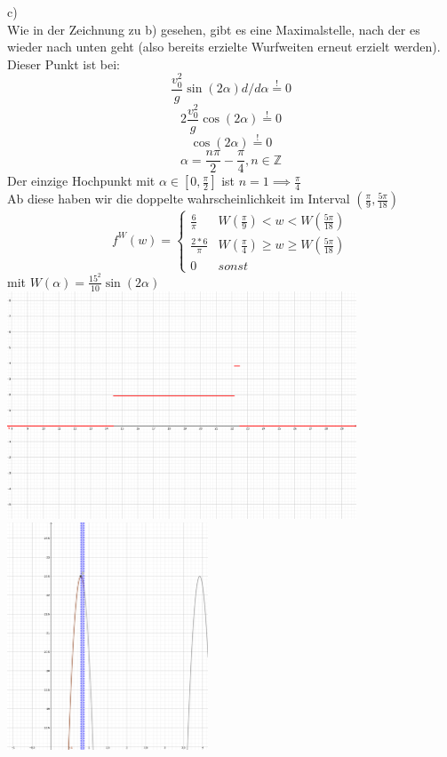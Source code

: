 \documentclass{article}
\begin{document}
	c)\\
	Wie in der Zeichnung zu b) gesehen, gibt es eine Maximalstelle, nach der es wieder nach unten geht (also bereits erzielte Wurfweiten erneut erzielt werden).\\
	Dieser Punkt ist bei:\\
	\[\frac{v_0^2}{g}\sin(2\alpha)d/d\alpha\stackrel{!}{=} 0\]
	\[2\frac{v_0^2}{g}\cos(2\alpha)\stackrel{!}{=} 0\]
	\[\cos(2\alpha)\stackrel{!}{=} 0\]
	\[\alpha = \frac{n\pi}{2}-\frac{\pi}{4}, n\in\mathbb{Z}\]
	Der einzige Hochpunkt mit $\alpha\in[0,\frac{\pi}{2}]$ ist $n=1\implies \frac{\pi}{4}$\\
	Ab diese haben wir die doppelte wahrscheinlichkeit im Interval $(\frac{\pi}{9},\frac{5\pi}{18})$\\
	\[f^W(w)=\begin{cases}
	\frac{6}{\pi}&W(\frac{\pi}{9})<w<W(\frac{5\pi}{18})\\
	\frac{2*6}{\pi}&W(\frac{\pi}{4})\geq w\geq W(\frac{5\pi}{18}) \\
	0&sonst
	\end{cases}\]
	mit $W(\alpha)=\frac{15^2}{10}\sin(2\alpha)$
	\includegraphics[height=256px]{intervalle.png}
	\includegraphics[height=256px]{gezeigtNichtNullIntervall.png}
\end{document}
